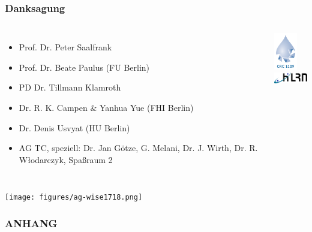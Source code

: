 \documentclass[hyperref={pdfpagelabels=false}]{beamer}
\begin{document}
\begin{frame}
 \frametitle{Danksagung}
 \begin{columns}
 \begin{itemize}
  \item Prof. Dr. Peter Saalfrank
  \item Prof. Dr. Beate Paulus (FU Berlin)
  \item PD Dr. Tillmann Klamroth
  \item Dr. R. K. Campen \& Yanhua Yue (FHI Berlin)
  \item Dr. Denis Usvyat (HU Berlin)
  \item AG TC, speziell: Dr. Jan Götze, G. Melani, Dr. J. Wirth, Dr. R. W\l{}odarczyk, Spa\ss{}raum 2
 \end{itemize}
 \centering
\includegraphics[width=1cm]{figures/crc1109.png}
\\
\includegraphics[width=2cm]{figures/hlrn_logo.png}
\end{columns}
\centering
\texttt{[image: figures/ag-wise1718.png]}

\end{frame}


\pagestyle{empty}
\begin{frame}[noframenumbering]
\frametitle{ANHANG}
\end{frame}
\end{document}
